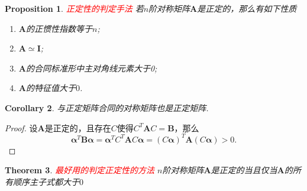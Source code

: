 \documentclass{article}
\newtheorem{theorem}{Theorem}[section]
\newtheorem{corollary}[theorem]{Corollary}
\newtheorem{proposition}[theorem]{Proposition}
\newcommand{\mbf}[1]{\bm{#1}}
\newcommand{\redt}[1]{\textcolor{red}{#1}}
\begin{document}
\begin{proposition}
\rm \redt{正定性的判定手法} 若$n$阶对称矩阵$\mbf{A}$是正定的，那么有如下性质
\begin{enumerate}
	\item $\mbf{A}$的正惯性指数等于$n$;
	\item $\mbf{A} \simeq \mbf{I}$;
	\item $\mbf{A}$的合同标准形中主对角线元素大于0;
	\item $\mbf{A}$的特征值大于$0$.
\end{enumerate}
\end{proposition}

\begin{corollary}\label{positive-definite: congruent}
\rm 与正定矩阵合同的对称矩阵也是正定矩阵.
\end{corollary}

\begin{proof}
\rm 设$\mbf{A}$是正定的，且存在$C$使得$C^T\mbf{A}C =\mbf{B}$，那么
$$
\mbf{\alpha}^T\mbf{B}\mbf{\alpha} = \mbf{\alpha}^TC^T\mbf{A}C\mbf{\alpha} = (C\mbf{\alpha})^T \mbf{A} (C\mbf{\alpha}) > 0.
$$
\end{proof}

\begin{theorem}
\rm \redt{最好用的判定正定性的方法} $n$阶对称矩阵$\mbf{A}$是正定的当且仅当$\mbf{A}$的所有顺序主子式都大于$0$
\end{theorem}
\end{document}
